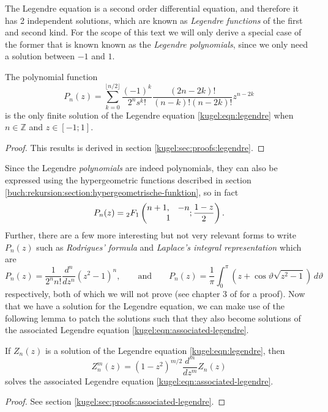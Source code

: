 The Legendre equation is a second order differential equation, and therefore it
has 2 independent solutions, which are known as \emph{Legendre functions} of the
first and second kind. For the scope of this text we will only derive a special
case of the former that is known known as the \emph{Legendre polynomials}, since
we only need a solution between $-1$ and $1$.

\begin{lemma}
  \label{kugel:thm:legendre-poly}
  The polynomial function
  \[
    P_n(z) = \sum^{\lfloor n/2 \rfloor}_{k=0}
      \frac{(-1)^k}{2^n s^k!} \frac{(2n - 2k)!}{(n - k)! (n-2k)!} z^{n - 2k}
  \]
  is the only finite solution of the Legendre equation
  \eqref{kugel:eqn:legendre} when $n \in \mathbb{Z}$ and $z \in [-1; 1]$.
\end{lemma}
\begin{proof}
  This results is derived in section \ref{kugel:sec:proofs:legendre}.
\end{proof}

Since the Legendre \emph{polynomials} are indeed polynomials, they can also be
expressed using the hypergeometric functions described in section
\ref{buch:rekursion:section:hypergeometrische-funktion}, so in fact
\begin{equation}
  P_n(z) = {}_2F_1 \left( \begin{matrix}
    n + 1, & -n \\ \multicolumn{2}{c}{1}
  \end{matrix} ; \frac{1 - z}{2} \right).
\end{equation}
Further, there are a few more interesting but not very relevant forms to write
$P_n(z)$ such as \emph{Rodrigues' formula} and \emph{Laplace's integral
representation} which are
\begin{equation*}
  P_n(z) = \frac{1}{2^n n!} \frac{d^n}{dz^n} (z^2 - 1)^n,
  \qquad \text{and} \qquad
  P_n(z) = \frac{1}{\pi} \int_0^\pi \left(
    z + \cos\vartheta \sqrt{z^2 - 1}
  \right) \, d\vartheta
\end{equation*}
respectively, both of which we will not prove (see chapter 3 of
\cite{bell_special_2004} for a proof). Now that we have a solution for the
Legendre equation, we can make use of the following lemma to patch the solutions
such that they also become solutions of the associated Legendre equation
\eqref{kugel:eqn:associated-legendre}.

\begin{lemma} \label{kugel:thm:extend-legendre}
  If $Z_n(z)$ is a solution of the Legendre equation \eqref{kugel:eqn:legendre},
  then
  \begin{equation*}
    Z^m_n(z) = (1 - z^2)^{m/2} \frac{d^m}{dz^m}Z_n(z)
  \end{equation*}
  solves the associated Legendre equation \eqref{kugel:eqn:associated-legendre}.
  \nocite{bell_special_2004}
\end{lemma}
\begin{proof}
  See section \ref{kugel:sec:proofs:associated-legendre}.
\end{proof}

